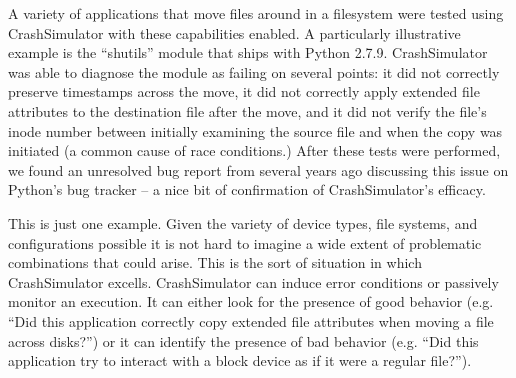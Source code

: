     A variety of applications that move files around in a filesystem were tested using CrashSimulator with these
    capabilities enabled.  A particularly illustrative example is the ``shutils'' module that ships with Python 2.7.9.
    CrashSimulator was able to diagnose the module as failing on several points: it did not correctly preserve
    timestamps across the move, it did not correctly apply extended file attributes to the destination file after the
    move, and it did not verify the file's inode number between initially examining the source file and when the copy
    was initiated (a common cause of race conditions.)  After these tests were performed, we found an unresolved bug
    report from several years ago discussing this issue on Python's bug tracker -- a nice bit of confirmation of
    CrashSimulator's efficacy.

    This is just one example.  Given the variety of device types, file systems, and configurations possible it is not
    hard to imagine a wide extent of problematic combinations that could arise.  This is the sort of situation in which
    CrashSimulator excells.  CrashSimulator can induce error conditions or passively monitor an execution.  It can
    either look for the presence of good behavior (e.g. ``Did this application correctly copy extended file attributes
    when moving a file across disks?'') or it can identify the presence of bad behavior (e.g. ``Did this application try to
    interact with a block device as if it were a regular file?'').  
